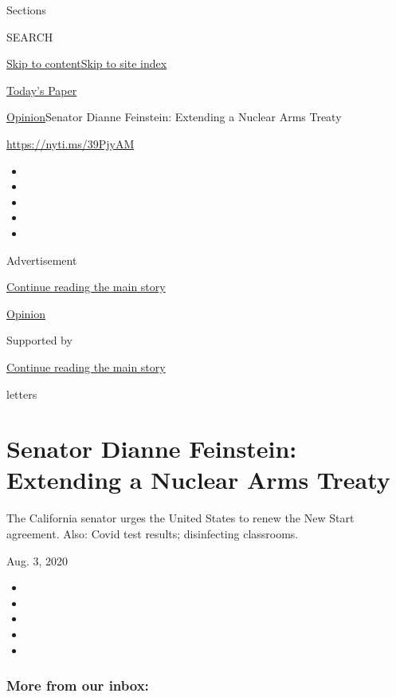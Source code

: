 Sections

SEARCH

\protect\hyperlink{site-content}{Skip to
content}\protect\hyperlink{site-index}{Skip to site index}

\href{https://myaccount.nytimes3xbfgragh.onion/auth/login?response_type=cookie\&client_id=vi}{}

\href{https://www.nytimes3xbfgragh.onion/section/todayspaper}{Today's
Paper}

\href{/section/opinion}{Opinion}\textbar{}Senator Dianne Feinstein:
Extending a Nuclear Arms Treaty

\url{https://nyti.ms/39PjyAM}

\begin{itemize}
\item
\item
\item
\item
\item
\end{itemize}

Advertisement

\protect\hyperlink{after-top}{Continue reading the main story}

\href{/section/opinion}{Opinion}

Supported by

\protect\hyperlink{after-sponsor}{Continue reading the main story}

letters

\hypertarget{senator-dianne-feinstein-extending-a-nuclear-arms-treaty}{%
\section{Senator Dianne Feinstein: Extending a Nuclear Arms
Treaty}\label{senator-dianne-feinstein-extending-a-nuclear-arms-treaty}}

The California senator urges the United States to renew the New Start
agreement. Also: Covid test results; disinfecting classrooms.

Aug. 3, 2020

\begin{itemize}
\item
\item
\item
\item
\item
\end{itemize}

\hypertarget{more-from-our-inbox}{%
\subsubsection{More from our inbox:}\label{more-from-our-inbox}}


